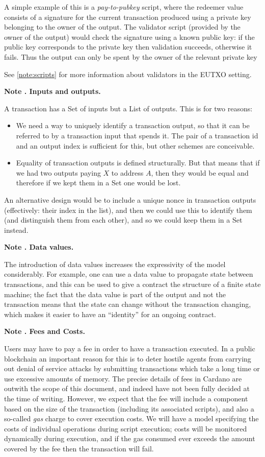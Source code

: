 \documentclass[a4paper]{article}
\newcounter{note}
\newcommand{\note}[1]{
  \bigskip
  \refstepcounter{note}
  \noindent\textbf{Note \thenote. #1}
}
\renewcommand{\i}{\textit}  %
\newcommand{\s}{\textsf}  %
\begin{document}
A simple example of this is a \i{pay-to-pubkey} script, where the
redeemer value consists of a signature for the current transaction produced
using a private key belonging to the owner of the output.  The
validator script (provided by the owner of the output) would check the
signature using a known public key: if the public key corresponds to
the private key then validation succeeds, otherwise it fails.  Thus
the output can only be spent by the owner of the relevant private key

See \cref{note:scripts} for more information about validators in
the EUTXO setting.

\note{Inputs and outputs.}
\label{note:inputs-and-outputs}
A transaction has a \textsf{Set} of inputs but a \textsf{List} of outputs.
This is for two reasons:
\begin{itemize}
  \item We need a way to uniquely identify a transaction output, so
  that it can be referred to by a transaction input that spends it. The pair of
  a transaction id and an output index is sufficient for this, but other schemes
  are conceivable.
  \item Equality of transaction outputs is defined structurally. But that means
    that if we had two outputs paying $X$ to address $A$, then they would be
    equal and therefore if we kept them in a \s{Set} one would be lost.
\end{itemize}

\noindent An alternative design would be to include a unique nonce in transaction outputs
(effectively: their index in the list), and then we could use this to identify
them (and distinguish them from each other), and so we could keep them in a \s{Set} instead.

\note{Data values.}
\label{note:data-values}
The introduction of data values
increases the expressivity of the model considerably. For example,
one can use a data value to propagate state between
transactions, and this can be used to give a contract the structure
of a finite state machine; the fact that the data value is part
of the output and not the transaction means that the state can
change without the transaction changing, which makes it easier to
have an ``identity'' for an ongoing contract.

\note{Fees and Costs.}
\label{note:fees}
Users may have to pay a fee in order to have a transaction executed.
In a public blockchain an important reason for this is to deter
hostile agents from carrying out denial of service attacks by
submitting transactions which take a long time or use excessive
amounts of memory.  The precise details of fees in Cardano are outwith
the scope of this document, and indeed have not been fully decided at
the time of writing. However, we expect that the fee will include a
component based on the size of the transaction (including its
associated scripts), and also a so-called \textit{gas} charge to cover
execution costs.  We will have a model specifying the costs of
individual operations during script execution; costs will be monitored
dynamically during execution, and if the gas consumed ever exceeds the
amount covered by the fee then the transaction will fail.
\end{document}
